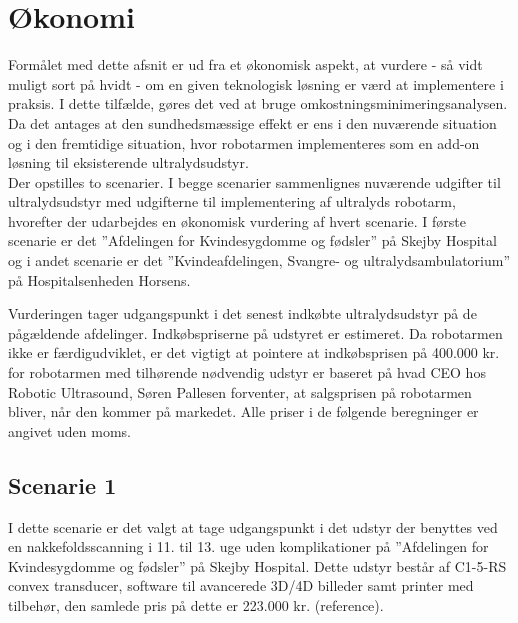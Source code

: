 \chapter{Økonomi} \label{Okonomi}
Formålet med dette afsnit er ud fra et økonomisk aspekt, at vurdere - så vidt muligt sort på hvidt - om en given teknologisk løsning er værd at implementere i praksis. I dette tilfælde, gøres det ved at bruge omkostningsminimeringsanalysen. Da det antages at den sundhedsmæssige effekt er ens i den nuværende situation og i den fremtidige situation, hvor robotarmen implementeres som en add-on løsning til eksisterende ultralydsudstyr. \\
Der opstilles to scenarier. I begge scenarier sammenlignes nuværende udgifter til ultralydsudstyr med udgifterne til implementering af ultralyds robotarm, hvorefter der udarbejdes en økonomisk vurdering af hvert scenarie. I første scenarie er det ”Afdelingen for Kvindesygdomme og fødsler” på Skejby Hospital og i andet scenarie er det ”Kvindeafdelingen, Svangre- og ultralydsambulatorium” på Hospitalsenheden Horsens. 

Vurderingen tager udgangspunkt i det senest indkøbte ultralydsudstyr på de pågældende afdelinger. Indkøbspriserne på udstyret er estimeret. Da robotarmen ikke er færdigudviklet, er det vigtigt at pointere at indkøbsprisen på 400.000 kr. for robotarmen med tilhørende nødvendig udstyr er baseret på hvad CEO hos Robotic Ultrasound, Søren Pallesen forventer, at salgsprisen på robotarmen bliver, når den kommer på markedet. Alle priser i de følgende beregninger er angivet uden moms. 

\section{Scenarie 1}
I dette scenarie er det valgt at tage udgangspunkt i det udstyr der benyttes ved en nakkefoldsscanning i 11. til 13. uge uden komplikationer på ”Afdelingen for Kvindesygdomme og fødsler” på Skejby Hospital. Dette udstyr består af C1-5-RS convex transducer, software til avancerede 3D/4D billeder samt printer med tilbehør, den samlede pris på dette er 223.000 kr. (reference). 

